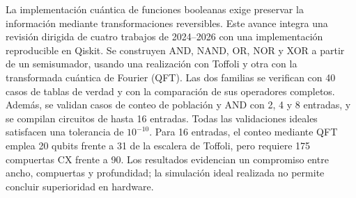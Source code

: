 La implementación cuántica de funciones booleanas exige preservar la información
mediante transformaciones reversibles. Este avance integra una revisión dirigida
de cuatro trabajos de 2024--2026 con una implementación reproducible en Qiskit.
Se construyen AND, NAND, OR, NOR y XOR a partir de un semisumador, usando una
realización con Toffoli y otra con la transformada cuántica de Fourier (QFT).
Las dos familias se verifican con 40 casos de tablas de verdad y con la comparación
de sus operadores completos. Además, se validan \ValidationCases{} casos de
conteo de población y AND con 2, 4 y 8 entradas, y se compilan circuitos de hasta
16 entradas. Todas las validaciones ideales satisfacen una tolerancia de
$10^{-10}$. Para 16 entradas, el conteo mediante QFT emplea 20 qubits frente a
31 de la escalera de Toffoli, pero requiere 175 compuertas CX frente a 90.
Los resultados evidencian un compromiso entre ancho, compuertas y profundidad;
la simulación ideal realizada no permite concluir superioridad en hardware.

